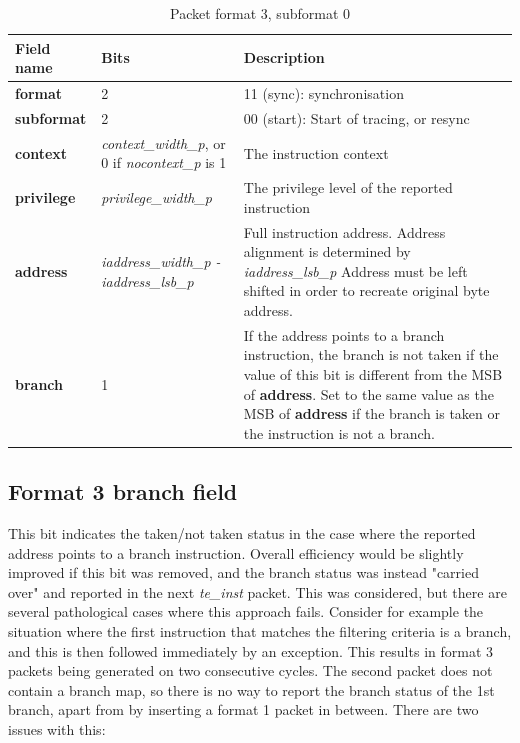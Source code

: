 \begin{table}[htp]
  \centering
  \caption{Packet format 3, subformat 0}
  \label{tab:te_inst3}
  \begin{tabulary}{\textwidth}{|l|p{35mm}|p{90mm}|}
    \hline
    {\bf Field name} & {\bf Bits} & {\bf Description} \\
    \hline
    \textbf{format} & 2 & 11 (sync): synchronisation\\
    \hline
    \textbf{subformat} & 2 & 00 (start): Start of tracing, or resync \\
    \hline
    \textbf{context} &  \textit {context\_width\_p}, 
               or 0 if \textit {nocontext\_p} is 1 & 
               The instruction context \\
    \hline
    \textbf{privilege} & \textit {privilege\_width\_p} & 
                The privilege level of the reported instruction\\
    \hline
    \textbf{address} & \textit {iaddress\_width\_p - iaddress\_lsb\_p} & 
              Full instruction address.  Address alignment is determined by \textit {iaddress\_lsb\_p} Address must be left shifted in order to recreate original byte address. \\
    \hline
    \textbf{branch} & 1 & If the address points to a branch instruction, the branch is not taken if the value of this bit is different from the MSB of \textbf{address}. 
    Set to the same value as the MSB of \textbf{address} if the branch is taken or the instruction is not a branch. \\
    \hline
  \end{tabulary}
\end{table}

\subsection{Format 3 \textbf{branch} field}

This bit indicates the taken/not taken status in the case where the reported address points to a branch instruction.
Overall efficiency would be slightly improved if this bit was removed, and the branch status was instead 
"carried over" and reported in the next \textit{te\_inst} packet.  This was considered, but there are several
pathological cases where this approach fails.  Consider for example the situation where the first instruction
that matches the filtering criteria is a branch, and this is then followed immediately by an exception.  This
results in format 3 packets being generated on two consecutive cycles.  The second packet does not contain a branch
map, so there is no way to report the branch status of the 1st branch, apart from by inserting a format 1 packet in 
between.  There are two issues with this:

